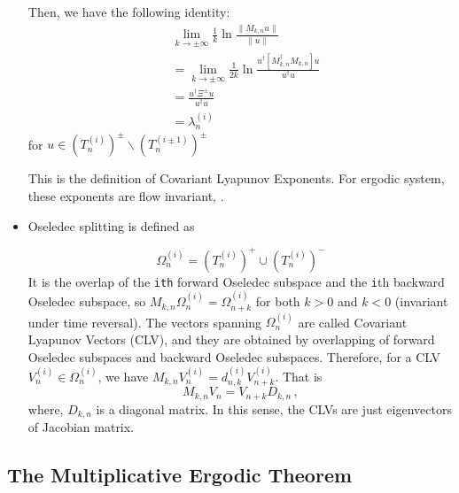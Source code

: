 \begin{itemize}
  Then, we have the following identity:
  \begin{align}
   &\lim_{k\to \pm \infty} \frac{1}{k} \ln \frac{\| M_{k,n}u \|}{\| u \|}  \\
   &=\lim_{k\to \pm \infty} \frac{1}{2k} \ln \frac{u^{\dagger}[M_{k,n}^{\dagger}M_{k,n}]u}{u^{\dagger} u}\\
   &=\frac{u^{\dagger}\Xi^{\pm}u}{u^{\dagger} u}\\
   &=\lambda_{n}^{(i)}
  \end{align}
  for $u\in (T_{n}^{(i)})^{\pm} \backslash (T_{n}^{(i\pm 1)})^{\pm}$

  This is the definition of Covariant Lyapunov Exponents. For
  ergodic system, these exponents are flow invariant,
  .
  \item Oseledec splitting is defined as

  \begin{equation}
   \Omega_{n}^{(i)}=(T_{n}^{(i)})^{+}\cup (T_{n}^{(i)})^{-}
   \label{equa::xiong_splitting}
  \end{equation}
   It is the overlap of the \texttt{ith} forward Oseledec subspace
   and the \texttt{i}th backward Oseledec subspace, so
   $M_{k,n}\Omega_{n}^{(i)}=\Omega_{n+k}^{(i)}$ for both $k>0$ and
   $k<0$ (invariant under time reversal). The vectors spanning
   ${\Omega_{n}^{(i)}}$ are called Covariant Lyapunov Vectors (CLV),
   and they are obtained by overlapping of forward Oseledec
   subspaces and backward Oseledec subspaces. Therefore, for a CLV
   $V_{n}^{(i)} \in \Omega_{n}^{(i)}$, we have
   $M_{k,n}V_{n}^{(i)}=d_{n,k}^{(i)}V_{n+k}^{(i)}$. That is
   \begin{equation}
    M_{k,n}V_{n}=V_{n+k}D_{k,n}
    \,,
    \label{eq::xiong_clv_evolve}
   \end{equation}
   where, $D_{k,n}$ is a diagonal matrix. In this sense, the CLVs are
   just eigenvectors of Jacobian matrix.

  \end{itemize}


\subsection{The Multiplicative Ergodic Theorem}


